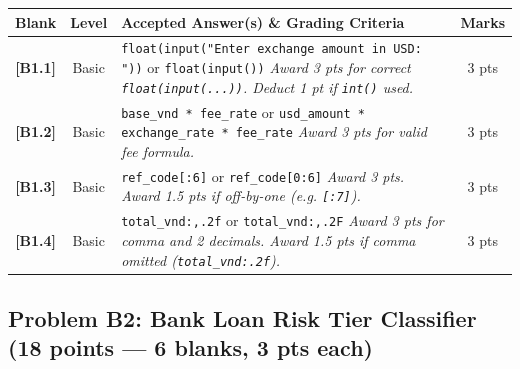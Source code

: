 \documentclass[11pt,a4paper]{article}
\begin{document}
\begin{center}
\renewcommand{\arraystretch}{1.2}
\setlength{\tabcolsep}{3.5pt}
\begin{tabularx}{\textwidth}{|c|c|X|c|}
\hline
\textbf{Blank} & \textbf{Level} & \textbf{Accepted Answer(s) \& Grading Criteria} & \textbf{Marks} \\
\hline
\textbf{[B1.1]} & Basic & \texttt{float(input("Enter exchange amount in USD: "))} or \texttt{float(input())}\newline
\textit{Award 3 pts for correct \texttt{float(input(...))}. Deduct 1 pt if \texttt{int()} used.} & 3 pts \\
\hline
\textbf{[B1.2]} & Basic & \texttt{base\_vnd * fee\_rate} or \texttt{usd\_amount * exchange\_rate * fee\_rate}\newline
\textit{Award 3 pts for valid fee formula.} & 3 pts \\
\hline
\textbf{[B1.3]} & Basic & \texttt{ref\_code[:6]} or \texttt{ref\_code[0:6]}\newline
\textit{Award 3 pts. Award 1.5 pts if off-by-one (e.g. \texttt{[:7]}).} & 3 pts \\
\hline
\textbf{[B1.4]} & Basic & \texttt{total\_vnd:,.2f} or \texttt{total\_vnd:,.2F}\newline
\textit{Award 3 pts for comma and 2 decimals. Award 1.5 pts if comma omitted (\texttt{total\_vnd:.2f}).} & 3 pts \\
\hline
\end{tabularx}
\end{center}

\newpage

\subsection*{Problem B2: Bank Loan Risk Tier Classifier (18 points --- 6 blanks, 3 pts each)}
\end{document}
